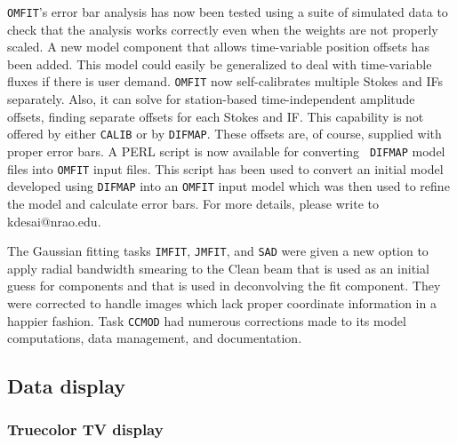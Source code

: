 {\tt OMFIT}'s error bar analysis has now been tested using a suite of
simulated data to check that the analysis works correctly even when
the weights are not properly scaled.  A new model component that
allows time-variable position offsets has been added.  This model
could easily be generalized to deal with time-variable fluxes if there
is user demand.  {\tt OMFIT} now self-calibrates multiple Stokes and
IFs separately.  Also, it can solve for station-based time-independent
amplitude offsets, finding separate offsets for each Stokes and
\hbox{IF}.  This capability is not offered by either {\tt CALIB} or by
\hbox{{\tt DIFMAP}}.  These offsets are, of course, supplied with
proper error bars.  A PERL script is now available for converting {\tt
DIFMAP} model files into {\tt OMFIT} input files.  This script has
been used to convert an initial model developed using {\tt DIFMAP}
into an {\tt OMFIT} input model which was then used to refine the
model and calculate error bars.  For more details, please write to
kdesai@nrao.edu.

The Gaussian fitting tasks {\tt IMFIT}, {\tt JMFIT}, and {\tt SAD}
were given a new option to apply radial bandwidth smearing to the
Clean beam that is used as an initial guess for components and that is
used in deconvolving the fit component.  They were corrected to handle
images which lack proper coordinate information in a happier fashion.
Task {\tt CCMOD} had numerous corrections made to its model
computations, data management, and documentation.

\subsection{Data display}

\subsubsection{Truecolor TV display}

